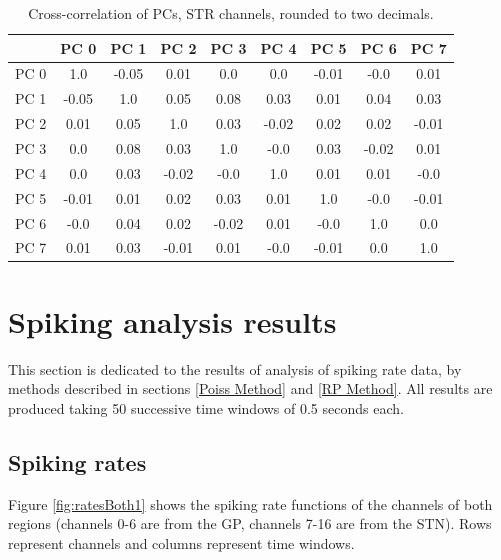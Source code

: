 \documentclass{kththesis}
\begin{document}
\begin{table}[H]
    \centering
    \begin{tabular}{|c|c|c|c|c|c|c|c|c|}
    \hline
          & PC 0  &  PC 1 &  PC 2 &  PC 3 &  PC 4 &  PC 5 &  PC 6 &  PC 7 \\ \hline
     PC 0 &  1.0  & -0.05 &  0.01 &  0.0  &  0.0  & -0.01 & -0.0  &  0.01 \\ \hline
     PC 1 & -0.05 &  1.0  &  0.05 &  0.08 &  0.03 &  0.01 &  0.04 &  0.03 \\ \hline
     PC 2 &  0.01 &  0.05 &  1.0  &  0.03 & -0.02 &  0.02 &  0.02 & -0.01 \\ \hline
     PC 3 &  0.0  &  0.08 &  0.03 &  1.0  & -0.0  &  0.03 & -0.02 &  0.01 \\ \hline
     PC 4 &  0.0  &  0.03 & -0.02 & -0.0  &  1.0  &  0.01 &  0.01 & -0.0  \\ \hline
     PC 5 & -0.01 &  0.01 &  0.02 &  0.03 &  0.01 &  1.0 &  -0.0  & -0.01 \\ \hline
     PC 6 & -0.0  &  0.04 &  0.02 & -0.02 &  0.01 & -0.0 &   1.0  &  0.0  \\ \hline
     PC 7 &  0.01 &  0.03 & -0.01 &  0.01 & -0.0  & -0.01 &  0.0  &  1.0  \\ \hline
    \end{tabular}
    \caption{Cross-correlation of PCs, STR channels, rounded to two decimals.}
    \label{tab:corrcoefSTR}
\end{table}

\section{Spiking analysis results}

This section is dedicated to the results of analysis of spiking rate data, by methods described in sections \ref{Poiss Method} and \ref{RP Method}.
All results are produced taking 50 successive time windows of 0.5 seconds each.

\subsection{Spiking rates}

Figure \ref{fig:ratesBoth1} shows the spiking rate functions of the channels of both regions (channels 0-6 are from the GP, channels 7-16 are from the STN). Rows represent channels and columns represent time windows. 
\end{document}
